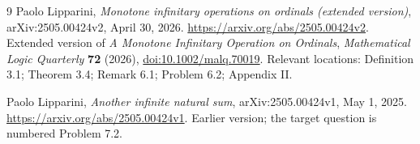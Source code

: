 \documentclass[11pt,letterpaper]{article}
\theoremstyle{definition}
\theoremstyle{remark}
\begin{document}
\begin{thebibliography}{9}
\small
{}
Paolo Lipparini,
\emph{Monotone infinitary operations on ordinals (extended version)},
arXiv:2505.00424v2, April 30, 2026.
\url{https://arxiv.org/abs/2505.00424v2}.
Extended version of \emph{A Monotone Infinitary Operation on Ordinals},
\emph{Mathematical Logic Quarterly} \textbf{72} (2026),
\href{https://doi.org/10.1002/malq.70019}{doi:10.1002/malq.70019}.
Relevant locations: Definition 3.1; Theorem 3.4; Remark 6.1; Problem 6.2; Appendix II.

Paolo Lipparini,
\emph{Another infinite natural sum},
arXiv:2505.00424v1, May 1, 2025.
\url{https://arxiv.org/abs/2505.00424v1}.
Earlier version; the target question is numbered Problem 7.2.
\end{thebibliography}
\end{document}
